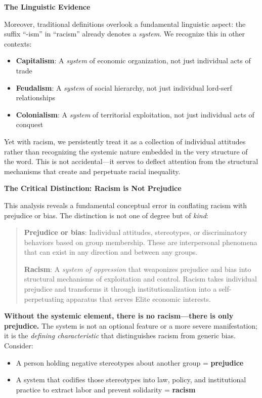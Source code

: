 \documentclass[12pt]{article}
\begin{document}
\textbf{The Linguistic Evidence}

Moreover, traditional definitions overlook a fundamental linguistic aspect: the suffix ``-ism'' in ``racism'' already denotes a \textit{system}. We recognize this in other contexts:
\begin{itemize}
    \item \textbf{Capitalism}: A \textit{system} of economic organization, not just individual acts of trade
    \item \textbf{Feudalism}: A \textit{system} of social hierarchy, not just individual lord-serf relationships
    \item \textbf{Colonialism}: A \textit{system} of territorial exploitation, not just individual acts of conquest
\end{itemize}

Yet with racism, we persistently treat it as a collection of individual attitudes rather than recognizing the systemic nature embedded in the very structure of the word. This is not accidental---it serves to deflect attention from the structural mechanisms that create and perpetuate racial inequality.

\textbf{The Critical Distinction: Racism is Not Prejudice}

This analysis reveals a fundamental conceptual error in conflating racism with prejudice or bias. The distinction is not one of degree but of \textit{kind}:

\begin{quote}
\textbf{Prejudice or bias}: Individual attitudes, stereotypes, or discriminatory behaviors based on group membership. These are interpersonal phenomena that can exist in any direction and between any groups.

\textbf{Racism}: A \textit{system of oppression} that weaponizes prejudice and bias into structural mechanisms of exploitation and control. Racism takes individual prejudice and transforms it through institutionalization into a self-perpetuating apparatus that serves Elite economic interests.
\end{quote}

\textbf{Without the systemic element, there is no racism---there is only prejudice.} The system is not an optional feature or a more severe manifestation; it is the \textit{defining characteristic} that distinguishes racism from generic bias. Consider:

\begin{itemize}
    \item A person holding negative stereotypes about another group = \textbf{prejudice}
    \item A system that codifies those stereotypes into law, policy, and institutional practice to extract labor and prevent solidarity = \textbf{racism}
\end{itemize}
\end{document}
